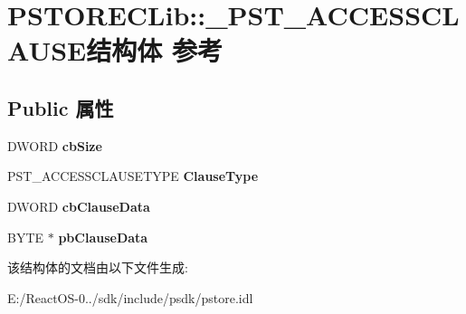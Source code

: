 \hypertarget{struct_p_s_t_o_r_e_c_lib_1_1___p_s_t___a_c_c_e_s_s_c_l_a_u_s_e}{}\section{P\+S\+T\+O\+R\+E\+C\+Lib\+:\+:\+\_\+\+P\+S\+T\+\_\+\+A\+C\+C\+E\+S\+S\+C\+L\+A\+U\+S\+E结构体 参考}
\label{struct_p_s_t_o_r_e_c_lib_1_1___p_s_t___a_c_c_e_s_s_c_l_a_u_s_e}
\subsection*{Public 属性}
\begin{DoxyCompactItemize}
\item 
\mbox{\label{struct_p_s_t_o_r_e_c_lib_1_1___p_s_t___a_c_c_e_s_s_c_l_a_u_s_e_a22d85f2c5a8cc6b747abd50caf787d91}} 
D\+W\+O\+RD {\bfseries cb\+Size}
\item 
\mbox{\label{struct_p_s_t_o_r_e_c_lib_1_1___p_s_t___a_c_c_e_s_s_c_l_a_u_s_e_ade584c6c2f855cc6de75ce8f6992f879}} 
P\+S\+T\+\_\+\+A\+C\+C\+E\+S\+S\+C\+L\+A\+U\+S\+E\+T\+Y\+PE {\bfseries Clause\+Type}
\item 
\mbox{\label{struct_p_s_t_o_r_e_c_lib_1_1___p_s_t___a_c_c_e_s_s_c_l_a_u_s_e_a96e0559b7d43561d414b4482aaa93138}} 
D\+W\+O\+RD {\bfseries cb\+Clause\+Data}
\item 
\mbox{\label{struct_p_s_t_o_r_e_c_lib_1_1___p_s_t___a_c_c_e_s_s_c_l_a_u_s_e_a4639f6696843e639f2d65b63468a39f4}} 
B\+Y\+TE $\ast$ {\bfseries pb\+Clause\+Data}
\end{DoxyCompactItemize}


该结构体的文档由以下文件生成\+:\begin{DoxyCompactItemize}
\item 
E\+:/\+React\+O\+S-\/0../sdk/include/psdk/pstore.\+idl\end{DoxyCompactItemize}
